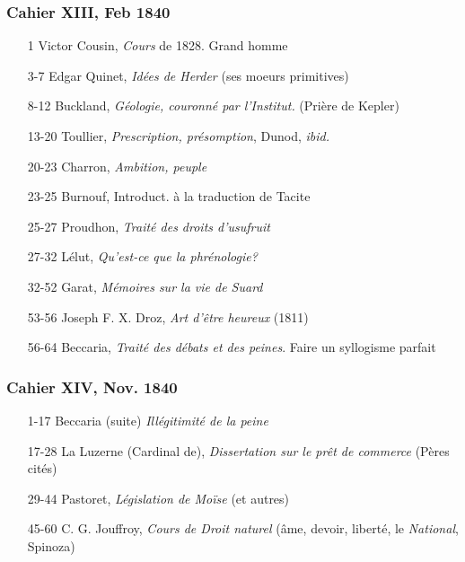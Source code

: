 \subsubsection*{Cahier XIII, Feb 1840}
\begin{enumerate}
    \item[1] Victor Cousin, \textit{Cours} de 1828. Grand homme
    \item[3-7] Edgar Quinet, \textit{Idées de Herder} (ses moeurs primitives)
    \item[8-12] Buckland, \textit{Géologie, couronné par l'Institut.} (Prière de Kepler)
    \item[13-20] Toullier, \textit{Prescription, présomption}, Dunod, \textit{ibid.}
    \item[20-23] Charron, \textit{Ambition, peuple}
    \item[23-25] Burnouf, Introduct. à la traduction de Tacite
    \item[25-27] Proudhon, \textit{Traité des droits d'usufruit}
    \item[27-32] Lélut, \textit{Qu'est-ce que la phrénologie?}
    \item[32-52] Garat, \textit{Mémoires sur la vie de Suard}
    \item[53-56] Joseph F. X. Droz, \textit{Art d'être heureux} (1811)
    \item[56-64] Beccaria, \textit{Traité des débats et des peines}. Faire un syllogisme parfait
\end{enumerate}

\subsubsection*{Cahier XIV, Nov. 1840}
\begin{enumerate}
    \item[1-17] Beccaria (suite) \textit{Illégitimité de la peine} 
    \item[17-28] La Luzerne (Cardinal de), \textit{Dissertation sur le prêt de commerce} (Pères cités)
    \item[29-44] Pastoret, \textit{Législation de Moïse} (et autres)
    \item[45-60] C. G. Jouffroy, \textit{Cours de Droit naturel} (âme, devoir, liberté, le \textit{National}, Spinoza)
\end{enumerate}

